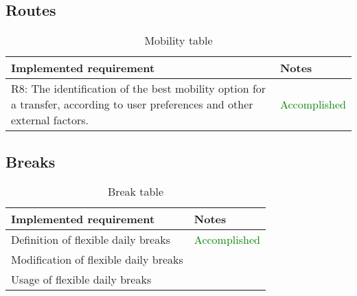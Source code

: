 \subsection{Routes}

\begin{flushleft}
	
	\begin{table}[htp]
		
		\begin{tabular}{p{7cm}|p{7cm}}
			Implemented requirement&Notes\\
			\hline
			\hline
R8: The identification of the best mobility option for a transfer, according to user preferences and other external factors.& \textcolor{green}{  Accomplished} \\
\hline

\end{tabular}

\caption{Mobility table } 
\label{tab:Mobilitytable}

\end{table}

\end{flushleft}



\subsection{Breaks}

\begin{flushleft}
	
	\begin{table}[htp]
		
		\begin{tabular}{p{7cm}|p{7cm}}
			Implemented requirement&Notes\\
			\hline
			\hline
Definition of flexible daily breaks&\textcolor{green}{Accomplished}\\
\hline
Modification of flexible daily breaks&\\
\hline
Usage of flexible daily breaks&\\
\hline

\end{tabular}

\caption{Break table } 
\label{tab:Breaktable}

\end{table}

\end{flushleft}

\clearpage

